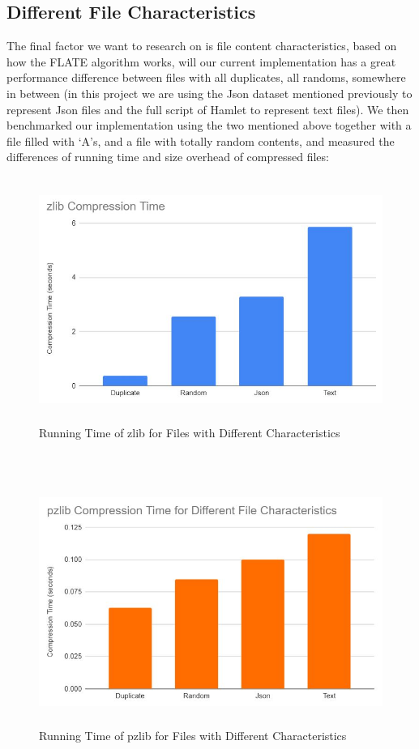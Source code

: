 \documentclass[12pt]{article}
\begin{document}
    \subsection{Different File Characteristics}
    The final factor we want to research on is file content characteristics, based on how the FLATE algorithm works, will our current implementation has a great performance difference between files with all duplicates, all randoms, somewhere in between (in this project we are using the Json dataset mentioned previously to represent Json files and the full script of Hamlet to represent text files).
    We then benchmarked our implementation using the two mentioned above together with a file filled with `A's, and a file with totally random contents,  and measured the differences of running time and size overhead of compressed files:
    \newpage
    \begin{figure}[!h]
    \begin{center}
    \includegraphics[height=8cm]{ZlibCompressionTimeFileChars.JPG}
    \caption{Running Time of zlib for Files with Different Characteristics}
    \end{center}
    \end{figure}
    ~\\
    \begin{figure}[!h]
    \begin{center}
    \includegraphics[height=8cm]{PZlibCompressionTimeFileChars.JPG}
    \caption{Running Time of pzlib for Files with Different Characteristics}
    \end{center}
    \end{figure}
\end{document}
